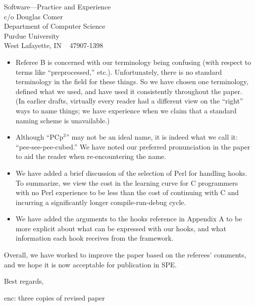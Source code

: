 \documentclass{letter}
\newcommand{\pcp}{\mbox{\textsf{PCp}$^3$}}
\begin{document}
\begin{letter}{
Software---Practice and Experience \\
c/o Douglas Comer \\
Department of Computer Science \\
Purdue University \\
West Lafayette, IN ~ 47907-1398}
\begin{itemize}
\item Referee B is concerned with our terminology being confusing (with
respect to terms like ``preprocessed,'' etc.).  Unfortunately, there is no
standard terminology in the field for these things.  So we have chosen one
terminology, defined what we used, and have used it consistently throughout
the paper.  (In earlier drafts, virtually every reader had a different view
on the ``right'' ways to name things; we have experience when we claim
that a standard naming scheme is unavailable.)

\item Although ``\pcp'' may not be an ideal name, it is indeed what we call
it: ``pee-see-pee-cubed.''  We have noted our preferred pronunciation in
the paper to aid the reader when re-encountering the name.

\item We have added a brief discussion of the selection of Perl for
handling hooks.  To summarize, we view the cost in the learning curve for C
programmers with no Perl experience to be less than the cost of continuing
with C and incurring a significantly longer compile-run-debug cycle.

\item We have added the arguments to the hooks reference in Appendix A 
      to be more explicit about what can be expressed with our hooks,
      and what information each hook receives from the framework.

\end{itemize}

Overall, we have worked to improve the paper based on the referees'
comments, and we hope it is now acceptable for publication in SPE.

\closing{Best regards,}

enc: three copies of revised paper
\end{letter}
\end{document}
